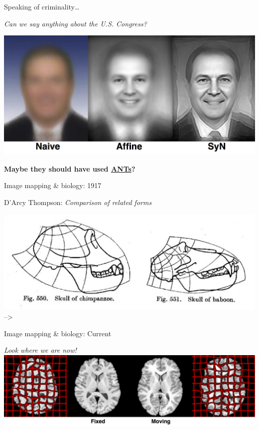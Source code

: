 \documentclass[ignorenonframetext,]{beamer}
\begin{document}
\begin{frame}{Speaking of criminality\ldots{}}

\emph{Can we say anything about the U.S. Congress?}

\includegraphics{./background/figures/congressPersons.png}

\textbf{Maybe they should have used
\href{https://github.com/ntustison/CongressionalFaceTemplates}{ANTs}?}

\end{frame}

\begin{frame}{Image mapping \& biology: 1917}

D'Arcy Thompson: \emph{Comparison of related forms}

\includegraphics{./figures/dthompson.png} --\textgreater{}

\end{frame}

\begin{frame}{Image mapping \& biology: Current}

 \emph{Look where we are now!}
\includegraphics{./background/figures/r16xr85.png}

\end{frame}
\end{document}
